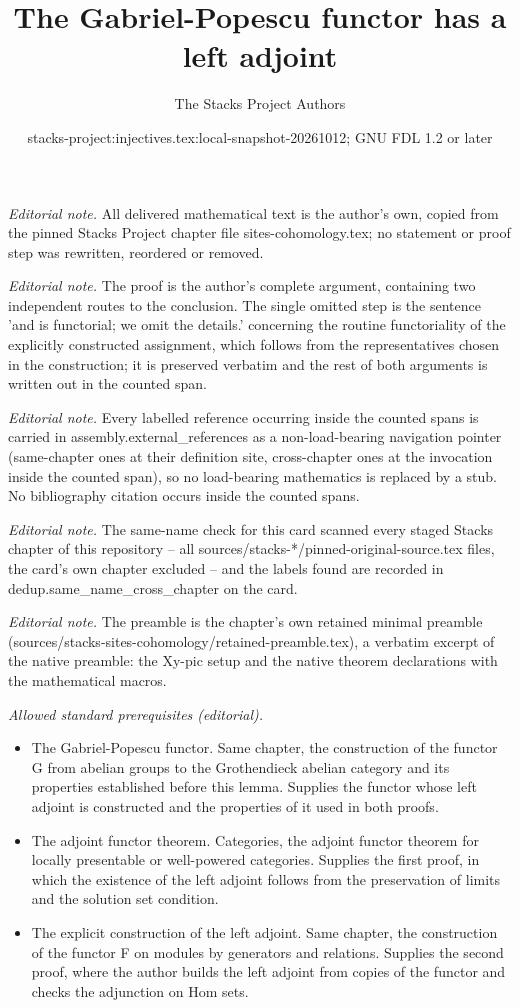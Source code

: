\documentclass[10pt,a4paper]{amsart}
\title{The Gabriel-Popescu functor has a left adjoint}
\author{The Stacks Project Authors}
\date{stacks-project:injectives.tex:local-snapshot-20261012; GNU FDL 1.2 or later}
\theoremstyle{plain}
\theoremstyle{definition}
\theoremstyle{remark}
\numberwithin{equation}{subsection}
\begin{document}
\maketitle
\noindent\textit{Editorial note.} All delivered mathematical text is the author's own, copied from the pinned Stacks Project chapter file sites-cohomology.tex; no statement or proof step was rewritten, reordered or removed.\par\medskip
\noindent\textit{Editorial note.} The proof is the author's complete argument, containing two independent routes to the conclusion. The single omitted step is the sentence 'and is functorial; we omit the details.' concerning the routine functoriality of the explicitly constructed assignment, which follows from the representatives chosen in the construction; it is preserved verbatim and the rest of both arguments is written out in the counted span.\par\medskip
\noindent\textit{Editorial note.} Every labelled reference occurring inside the counted spans is carried in assembly.external\_references as a non-load-bearing navigation pointer (same-chapter ones at their definition site, cross-chapter ones at the invocation inside the counted span), so no load-bearing mathematics is replaced by a stub. No bibliography citation occurs inside the counted spans.\par\medskip
\noindent\textit{Editorial note.} The same-name check for this card scanned every staged Stacks chapter of this repository -- all sources/stacks-*/pinned-original-source.tex files, the card's own chapter excluded -- and the labels found are recorded in dedup.same\_name\_cross\_chapter on the card.\par\medskip
\noindent\textit{Editorial note.} The preamble is the chapter's own retained minimal preamble (sources/stacks-sites-cohomology/retained-preamble.tex), a verbatim excerpt of the native preamble: the Xy-pic setup and the native theorem declarations with the mathematical macros.\par\medskip
\noindent\textit{Allowed standard prerequisites (editorial).}\begin{itemize}
\item The Gabriel-Popescu functor. Same chapter, the construction of the functor G from abelian groups to the Grothendieck abelian category and its properties established before this lemma. Supplies the functor whose left adjoint is constructed and the properties of it used in both proofs.
\item The adjoint functor theorem. Categories, the adjoint functor theorem for locally presentable or well-powered categories. Supplies the first proof, in which the existence of the left adjoint follows from the preservation of limits and the solution set condition.
\item The explicit construction of the left adjoint. Same chapter, the construction of the functor F on modules by generators and relations. Supplies the second proof, where the author builds the left adjoint from copies of the functor and checks the adjunction on Hom sets.
\end{itemize}\medskip
\end{document}
